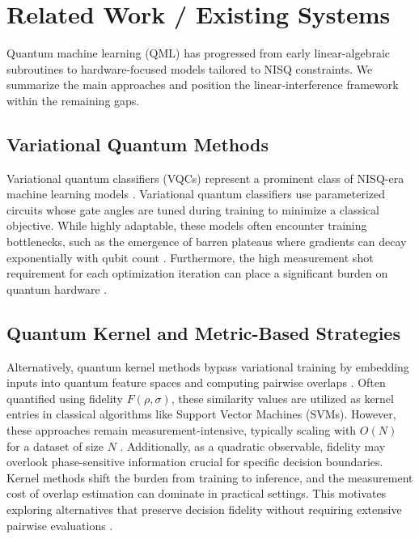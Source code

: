 \documentclass[conference]{IEEEtran}
\begin{document}
\section{Related Work / Existing Systems}

Quantum machine learning (QML) has progressed from early linear-algebraic subroutines to hardware-focused models tailored to NISQ constraints. We summarize the main approaches and position the linear-interference framework within the remaining gaps.

\subsection{Variational Quantum Methods}
Variational quantum classifiers (VQCs) represent a prominent class of NISQ-era machine learning models \cite{benedetti2019parameterized,abbas2021power}. Variational quantum classifiers use parameterized circuits whose gate angles are tuned during training to minimize a classical objective. While highly adaptable, these models often encounter training bottlenecks, such as the emergence of barren plateaus where gradients can decay exponentially with qubit count \cite{mcclean2018barren}. Furthermore, the high measurement shot requirement for each optimization iteration can place a significant burden on quantum hardware \cite{benedetti2019parameterized}.

\subsection{Quantum Kernel and Metric-Based Strategies}
Alternatively, quantum kernel methods bypass variational training by embedding inputs into quantum feature spaces and computing pairwise overlaps \cite{schuld2019feature,havlicek2019supervised}. Often quantified using fidelity $F(\rho, \sigma)$, these similarity values are utilized as kernel entries in classical algorithms like Support Vector Machines (SVMs). However, these approaches remain measurement-intensive, typically scaling with $O(N)$ for a dataset of size $N$ \cite{schuld2019feature,havlicek2019supervised}. Additionally, as a quadratic observable, fidelity may overlook phase-sensitive information crucial for specific decision boundaries.
Kernel methods shift the burden from training to inference, and the measurement cost of overlap estimation can dominate in practical settings. This motivates exploring alternatives that preserve decision fidelity without requiring extensive pairwise evaluations \cite{schuld2019feature,havlicek2019supervised}.
\end{document}
